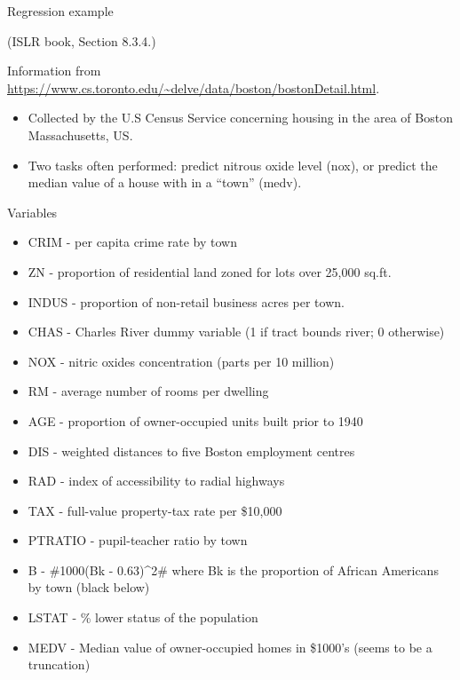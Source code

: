 \documentclass[
  ignorenonframetext,
]{beamer}
\providecommand{\tightlist}{%
  \setlength{\itemsep}{0pt}\setlength{\parskip}{0pt}}
\begin{document}
\begin{frame}

\begin{block}{Regression example}

(ISLR book, Section 8.3.4.)

Information from
\url{https://www.cs.toronto.edu/~delve/data/boston/bostonDetail.html}.

\begin{itemize}
\tightlist
\item
  Collected by the U.S Census Service concerning housing in the area of
  Boston Massachusetts, US.
\item
  Two tasks often performed: predict nitrous oxide level (nox), or
  predict the median value of a house with in a ``town'' (medv).
\end{itemize}

\end{block}

\end{frame}

\begin{frame}

\begin{block}{Variables}

\begin{itemize}
\tightlist
\item
  CRIM - per capita crime rate by town
\item
  ZN - proportion of residential land zoned for lots over 25,000 sq.ft.
\item
  INDUS - proportion of non-retail business acres per town.
\item
  CHAS - Charles River dummy variable (1 if tract bounds river; 0
  otherwise)
\item
  NOX - nitric oxides concentration (parts per 10 million)
\item
  RM - average number of rooms per dwelling
\item
  AGE - proportion of owner-occupied units built prior to 1940
\item
  DIS - weighted distances to five Boston employment centres
\item
  RAD - index of accessibility to radial highways
\item
  TAX - full-value property-tax rate per \$10,000
\item
  PTRATIO - pupil-teacher ratio by town
\item
  B - \#1000(Bk - 0.63)\^{}2\# where Bk is the proportion of African
  Americans by town (black below)
\item
  LSTAT - \% lower status of the population
\item
  MEDV - Median value of owner-occupied homes in \$1000's (seems to be a
  truncation)
\end{itemize}

\end{block}

\end{frame}
\end{document}
